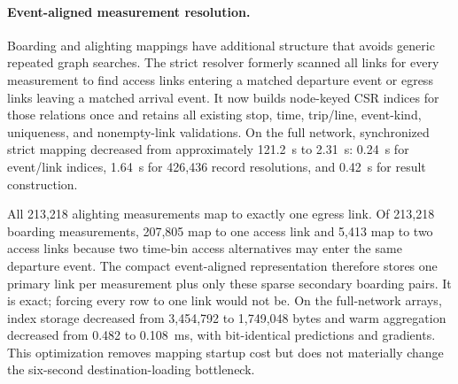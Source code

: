 \paragraph{Event-aligned measurement resolution.}
Boarding and alighting mappings have additional structure that avoids generic
repeated graph searches. The strict resolver formerly scanned all links for
every measurement to find access links entering a matched departure event or
egress links leaving a matched arrival event. It now builds node-keyed CSR
indices for those relations once and retains all existing stop, time,
trip/line, event-kind, uniqueness, and nonempty-link validations. On the full
network, synchronized strict mapping decreased from approximately 121.2~s to
2.31~s: 0.24~s for event/link indices, 1.64~s for 426,436 record resolutions,
and 0.42~s for result construction.

All 213,218 alighting measurements map to exactly one egress link. Of 213,218
boarding measurements, 207,805 map to one access link and 5,413 map to two
access links because two time-bin access alternatives may enter the same
departure event. The compact event-aligned representation therefore stores one
primary link per measurement plus only these sparse secondary boarding pairs.
It is exact; forcing every row to one link would not be. On the full-network
arrays, index storage decreased from 3,454,792 to 1,749,048 bytes and warm
aggregation decreased from 0.482 to 0.108~ms, with bit-identical predictions
and gradients. This optimization removes mapping startup cost but does not
materially change the six-second destination-loading bottleneck.

